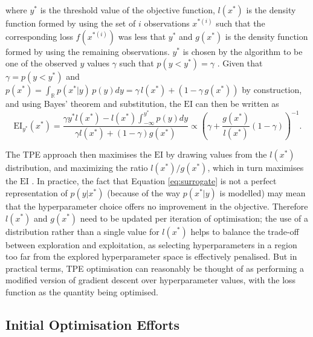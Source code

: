 where $y^*$ is the threshold value of the objective function, $l(x^*)$ is the density function formed by using the set of $i$ observations ${x^{*(i)}}$ such that the corresponding loss $f(x^{*(i)})$ was less that $y^*$ and $g(x^*)$ is the density function formed by using the remaining observations. $y^*$ is chosen by the algorithm to be one of the observed $y$ values $\gamma$ such that $p(y<y^*)=\gamma$ \cite{bergestra}. Given that $\gamma=p(y<y^*)$ and $p(x^*)=\int_{\mathbb{R}}p(x^*|y)\,p(y)dy=\gamma\,l(x^*)+(1-\gamma\,g(x^*))$ by construction, and using Bayes' theorem and substitution, the $\textrm{EI}$ can then be written as 
\begin{equation}
    \textrm{EI}_{y^*}(x^*)=\frac{\gamma y^* \textit{l}(x^*)-\textit{l}(x^*)\int_{-\infty}^{y^*}p(y)dy}{\gamma \textit{l}(x^*)+(1-\gamma) \textit{g}(x^*)} \propto \left( \gamma +\frac{\textit{g}(x^*)}{\textit{l}(x^*)} (1-\gamma)\right)^{-1}.
\end{equation}

The TPE approach then maximises the $\textrm{EI}$ by drawing values from the $\textit{l}(x^*)$ distribution, and maximizing the ratio $\textit{l}(x^*)/\textit{g}(x^*)$, which in turn maximises the $\textrm{EI}$ \cite{tdshyper}. In practice, the fact that Equation \ref{eq:surrogate} is not a perfect representation of $p(y|x^*)$ (because of the way $p(x^*|y)$ is modelled) may mean that the hyperparameter choice offers no improvement in the objective. Therefore $l(x^*)$ and $g(x^*)$ need to be updated per iteration of optimisation; the use of a distribution rather than a single value for $\textit{l}(x^*)$ helps to balance the trade-off between exploration and exploitation, as selecting hyperparameters in a region too far from the explored hyperparameter space is effectively penalised. But in practical terms, TPE optimisation can reasonably be thought of as performing a modified version of gradient descent over hyperparameter values, with the loss function as the quantity being optimised.

\subsection{Initial Optimisation Efforts}

